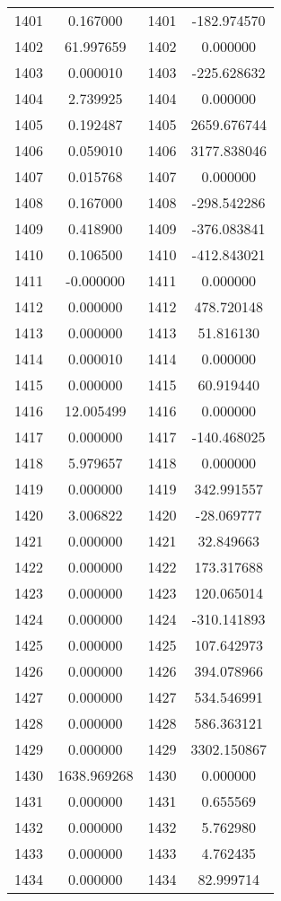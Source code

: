 \documentclass[12pt]{article}
\begin{document}
\begin{longtable}{@{}cccc@{}}
1401 & 0.167000 & 1401 & -182.974570 \\
1402 & 61.997659 & 1402 & 0.000000 \\
1403 & 0.000010 & 1403 & -225.628632 \\
1404 & 2.739925 & 1404 & 0.000000 \\
1405 & 0.192487 & 1405 & 2659.676744 \\
1406 & 0.059010 & 1406 & 3177.838046 \\
1407 & 0.015768 & 1407 & 0.000000 \\
1408 & 0.167000 & 1408 & -298.542286 \\
1409 & 0.418900 & 1409 & -376.083841 \\
1410 & 0.106500 & 1410 & -412.843021 \\
1411 & -0.000000 & 1411 & 0.000000 \\
1412 & 0.000000 & 1412 & 478.720148 \\
1413 & 0.000000 & 1413 & 51.816130 \\
1414 & 0.000010 & 1414 & 0.000000 \\
1415 & 0.000000 & 1415 & 60.919440 \\
1416 & 12.005499 & 1416 & 0.000000 \\
1417 & 0.000000 & 1417 & -140.468025 \\
1418 & 5.979657 & 1418 & 0.000000 \\
1419 & 0.000000 & 1419 & 342.991557 \\
1420 & 3.006822 & 1420 & -28.069777 \\
1421 & 0.000000 & 1421 & 32.849663 \\
1422 & 0.000000 & 1422 & 173.317688 \\
1423 & 0.000000 & 1423 & 120.065014 \\
1424 & 0.000000 & 1424 & -310.141893 \\
1425 & 0.000000 & 1425 & 107.642973 \\
1426 & 0.000000 & 1426 & 394.078966 \\
1427 & 0.000000 & 1427 & 534.546991 \\
1428 & 0.000000 & 1428 & 586.363121 \\
1429 & 0.000000 & 1429 & 3302.150867 \\
1430 & 1638.969268 & 1430 & 0.000000 \\
1431 & 0.000000 & 1431 & 0.655569 \\
1432 & 0.000000 & 1432 & 5.762980 \\
1433 & 0.000000 & 1433 & 4.762435 \\
1434 & 0.000000 & 1434 & 82.999714 \\

\end{longtable}
\end{document}
